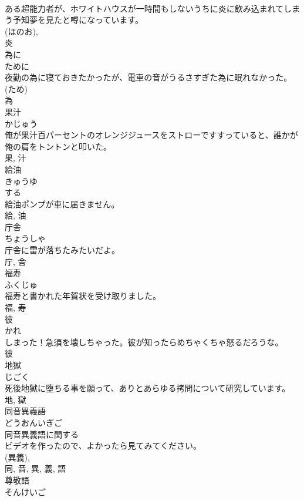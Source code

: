 \documentclass[8pt]{extreport}
\begin{document}
\begin{CJK}{UTF8}{min}
\\	ある超能力者が、ホワイトハウスが一時間もしないうちに炎に飲み込まれてしまう予知夢を見たと噂になっています。	
\\	(ほのお), 
\\	炎	
\\	為に	
\\	ために	
\\	夜勤の為に寝ておきたかったが、電車の音がうるさすぎた為に眠れなかった。	
\\	(ため) 
\\	為	
\\	果汁	
\\	かじゅう	
\\	俺が果汁百パーセントのオレンジジュースをストローですすっていると、誰かが俺の肩をトントンと叩いた。	
\\	果, 汁	
\\	給油	
\\	きゅうゆ	
\\	する 
\\	給油ポンプが車に届きません。	
\\	給, 油	
\\	庁舎	
\\	ちょうしゃ	
\\	庁舎に雷が落ちたみたいだよ。	
\\	庁, 舎	
\\	福寿	
\\	ふくじゅ	
\\	福寿と書かれた年賀状を受け取りました。	
\\	福, 寿	
\\	彼	
\\	かれ	
\\	しまった！急須を壊しちゃった。彼が知ったらめちゃくちゃ怒るだろうな。	
\\	彼	
\\	地獄	
\\	じごく	
\\	死後地獄に堕ちる事を願って、ありとあらゆる拷問について研究しています。	
\\	地, 獄	
\\	同音異義語	
\\	どうおんいぎご	
\\	同音異義語に関する
\\	ビデオを作ったので、よかったら見てみてください。	
\\	(異義), 
\\	同, 音, 異, 義, 語	
\\	尊敬語	
\\	そんけいご	

\end{CJK}
\end{document}

